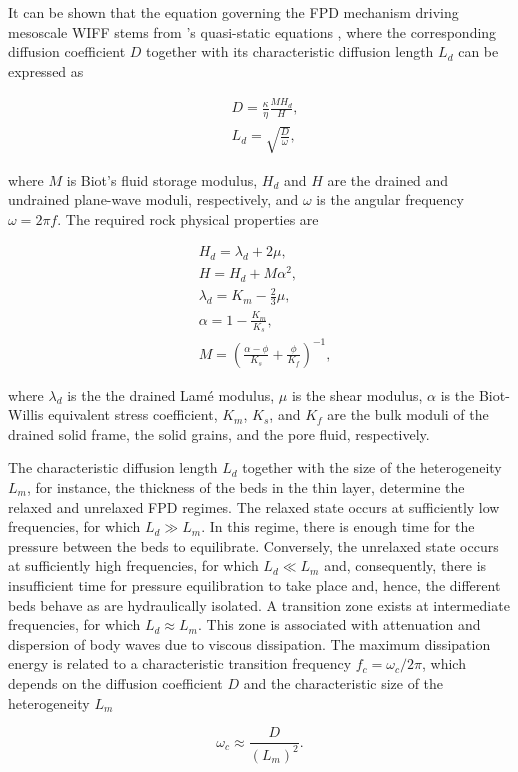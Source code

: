 \documentclass[draft]{agujournal2019}
\begin{document}
It can be shown that the equation governing the FPD mechanism driving mesoscale WIFF stems from \citeauthor{Biot1941}'s \citeyear{Biot1941} quasi-static equations \cite{Dutta1979, Chandler1981, Norris1993}, where the corresponding diffusion coefficient $D$  together with its characteristic diffusion length $L_d$ can be expressed as \cite{Norris1993}
\begin{linenomath*}
\begin{equation}\label{Eq.3}
\begin{split}
&D= \frac {\kappa} {\eta} \frac{M H_d}{H},\\
&L_d=\sqrt{\frac{D}{\omega}},
\end{split}
\end{equation}
\end{linenomath*}
where $M$ is Biot’s fluid storage modulus, $H_d$ and $H$ are the drained and undrained plane-wave moduli, respectively, and $\omega$ is the angular frequency $\omega = 2 \pi f$.
The required rock physical properties are
\begin{linenomath*}
\begin{equation}\label{Eq.4}
\begin{split}
& H_d = \lambda_d + 2 \mu, \\
& H = H_d + M \alpha ^2, \\
& \lambda_d= K_m - \frac{2}{3} \mu, \\
& \alpha =1-\frac{K_m}{K_s},\\
& M  =\left( \frac{\alpha-\phi}{K_s} +\frac{\phi}{K_f} \right)^{-1},
\end{split}
\end{equation}
\end{linenomath*}
where $\lambda_d$ is the the drained Lamé modulus, $\mu$ is the shear modulus, $\alpha$ is the Biot-Willis equivalent stress coefficient, $K_m$, $K_s$, and $K_f$ are the bulk moduli of the drained solid frame, the solid grains, and the pore fluid, respectively.

The characteristic diffusion length $L_d$ together with the size of the heterogeneity $L_m$, for instance, the thickness of the beds in the thin layer, determine the relaxed and unrelaxed FPD regimes. The relaxed state occurs at sufficiently low frequencies, for which  $L_d \gg L_m$. In this regime, there is enough time for the pressure between the beds to equilibrate. Conversely, the unrelaxed state occurs at sufficiently high frequencies, for which $L_d \ll L_m$ and, consequently, there is insufficient time for pressure equilibration to take place and, hence, the different beds behave as are hydraulically isolated. A transition zone exists at intermediate frequencies, for which $L_d \approx L_m$.
This zone is associated with attenuation and dispersion of body waves due to viscous dissipation. The maximum dissipation energy is related to a characteristic transition frequency $f_c= \omega_c/2\pi$, which depends on the diffusion coefficient $D$ and the characteristic size of the heterogeneity $L_m$ \cite{Muller2006}
\begin{linenomath*}
\begin{equation}\label{Eq.5}
\omega_c \approx \frac{D}{(L_m)^2}.
\end{equation}
\end{linenomath*}
\end{document}

